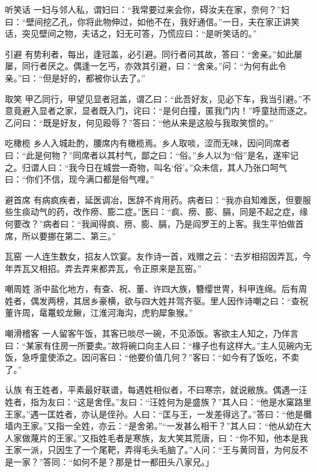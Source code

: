 \documentclass[12pt,UTF8]{ctexbook}
\begin{document}
听笑话
一妇与邻人私，谓妇曰：“我常要过来会你，碍汝夫在家，奈何？”妇曰：“壁间挖乙孔，你将此物伸过，如他不在，我好通信。”一日，夫在家正讲笑话，突见壁间之物，夫诘之，妇无可答，乃慌应曰：“是听笑话的。”

引避
有势利者，每出，逢冠盖，必引避。同行者问其故，答曰：“舍亲。”如此屡屡，同行者厌之。偶逢一乞丐，亦效其引避，曰：“舍亲。”问：“为何有此令亲。”曰：“但是好的，都被你认去了。”

取笑
甲乙同行，甲望见显者冠盖，谓乙曰：“此吾好友，见必下车，我当引避。”不意竟避入显者之家，显者既入门，诧曰：“是何白撞，匿我门内！”呼童挞而逐之。乙问曰：“既是好友，何见殴辱？”答曰：“他从来是这般与我取笑惯的。”

吃橄榄
乡人入城赴酌，腰席内有橄榄焉。乡人取啖，涩而无味，因问同席者曰：“此是何物？”同席者以其村气，鄙之曰：“俗。”乡人以为“俗”是名，遂牢记之。归谓人曰：“我今日在城尝一奇物，叫名‘俗’。”众未信，其人乃张口呵气曰：“你们不信，现今满口都是俗气哩。”

避首席
有病疯疾者，延医调冶，医辞不肯用药。病者曰：“我亦自知难医，但要服些生痰动气的药，改作痨、膨二症。”医曰：“疯、痨、膨、膈，同是不起之症，缘何要改？”病者曰：“我闻得疯、痨、膨、膈，乃是阎罗王的上客。我生平怕做首席，所以要挪在第二、第三。”

瓦窑
一人连生数女，招友人饮宴。友作诗一首，戏赠之云：“去岁相招因弄瓦，今年弄瓦又相招。弄去弄来都弄瓦，令正原来是瓦窑。”

嘲周姓
浙中盐化地方，有查、祝、董、许四大族，簪缨世冑，科甲连绵。后有周姓者，偶发两榜，其居乡豪横，欲与四大姓并驾齐驱。里人因作诗嘲之曰：“查祝董许周，鼋鼍蛟龙鳅，江淮河海沟，虎豹犀象猴。”

嘲滑稽客
一人留客午饭，其客已啖尽一碗，不见添饭。客欲主人知之，乃佯言曰：“某家有住房一所要卖。”故将碗口向主人曰：“椽子也有这样大。”主人见碗内无饭，急呼童使添之。因问客曰：“他要价值几何？”客曰：“如今有了饭吃，不卖了。”

认族
有王姓者，平素最好联谱，每遇姓相似者，不曰寒宗，就说敝族。偶遇一汪姓者，指为友曰：“这是舍侄。”友曰：“汪姓何为是盛族？”其人曰：“他是水窠路里王家。”遇一匡姓者，亦认是侄孙。人曰：“匡与王，一发差得远了。”答曰：“他是㰙墙内王家。”又指一全姓，亦云：“是舍弟。”“一发甚么相干？”其人曰：“他从幼在大人家做蔑片的王家。”又指姓毛者是寒族，友大笑其荒唐，曰：“你不知，他本是我王家一派，只因生了一个尾靶，弄得毛头毛脑了。”人问：“王与黄同音，为何反不是一家？”答同：“如何不是？那是廿一都田头八家兄。」

\part{}
\end{document}
